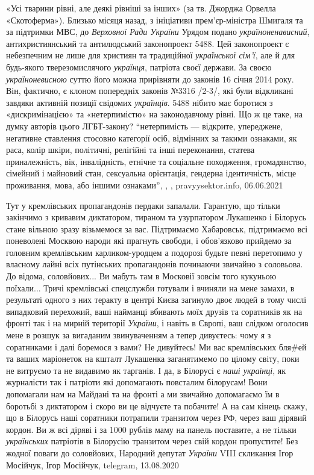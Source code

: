«Усі тварини рівні, але деякі рівніші за інших» (за тв. Джорджа Орвелла «Скотоферма»).
Близько місяця назад, з ініціативи прем'єр-міністра Шмигаля та за підтримки
МВС, до \emph{Верховної Ради України} Урядом подано \emph{україноненависний},
антихристиянський та антилюдський законопроект 5488. Цей законопроект є
небезпечним не лише для християн та традиційної \emph{української сім'ї}, але й
для будь-якого тверезомислячого \emph{українця}, патріота своєї держави. За
своєю \emph{україноневисною} суттю його можна прирівняти до законів 16 січня
2014 року. Він, фактично, є клоном попередніх законів №3316 /2-3/, які були
відкликані завдяки активній позиції свідомих \emph{українців}.  5488 нібито має
боротися з «дискримінацією» та «нетерпимістю» на законодавчому рівні. Що ж це
таке, на думку авторів цього ЛГБТ-закону? \enquote{нетерпимість — відкрите,
упереджене, негативне ставлення стосовно категорії осіб, відмінних за такими
ознаками, як раса, колір шкіри, політичні, релігійні та інші переконання,
статева приналежність, вік, інвалідність, етнічне та соціальне походження,
громадянство, сімейний і майновий стан, сексуальна орієнтація, гендерна
ідентичність, місце проживання, мова, або іншими ознаками},
, , pravyysektor.info, 06.06.2021

Тут у кремлівських пропагандонів пердаки запалали.  Гарантую, що тільки
закінчимо з кривавим диктатором, тираном та узурпатором Лукашенко і Білорусь
стане вільною зразу візьмемося за вас. Підтримаємо Хабаровськ, підтримаємо всі
поневолені Москвою народи які прагнуть свободи, і обов'язково прийдемо за
головним кремлівським карликом-уродцем а подорозі будьте певні перетопимо у
власному лайні всіх путінських пропагандонів починаючи звичайно з соловьова.
До відома, соловйових...  Ви мабуть там в Московії зовсім того кукуньою
поїхали... Тричі кремлівські спецслужби готували і вчиняли на мене замахи, в
результаті одного з них теракту в центрі Києва загинуло двоє людей в тому числі
випадковий перехожий, ваші найманці вбивають моїх друзів та соратників як на
фронті так і на мирній території \emph{України}, і навіть в Європі, ваш слідком
оголосив мене в розшук за вигаданим звинуваченням а тепер дивуєтесь: чому я з
соратниками і далі боремося з вами?  Не дивуйтесь! Ми вас кремлівських бля\#ей
та ваших маріонеток на кшталт Лукашенка заганятимемо по цілому світу, поки не
витруємо та не видавимо як тарганів. І да, в Білорусі є \emph{наші українці}, як
журналісти так і патріоти які допомагають повсталим білорусам! Вони допомагали
нам на Майдані та на фронті а ми звичайно допомагаємо їм в боротьбі з
диктатором і скоро ви це відчуєте та побачите!  А на сам кінець скажу, що в
Білорусь наші соратники потрапили транзитом через РФ, через ваш дірявий кордон.
Ви ж всі діряві і за 1000 рублів маму на панель поставите, а не тільки
\emph{українських} патріотів в Білорусію транзитом через свій кордон пропустите!  Без
жодної поваги до соловйових, Народний депутат \emph{України} VIII скликання Ігор
Мосійчук,
Ігор Мосійчук, telegram, 13.08.2020

